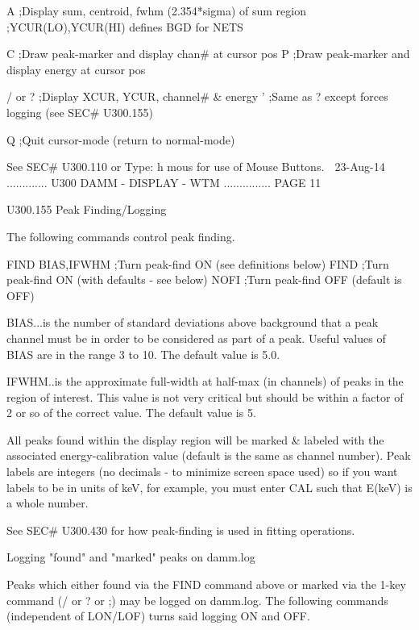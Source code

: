    A              ;Display sum, centroid, fwhm (2.354*sigma) of sum region
                  ;YCUR(LO),YCUR(HI) defines BGD for NETS
 
   C              ;Draw peak-marker and display chan#  at cursor pos
   P              ;Draw peak-marker and display energy at cursor pos
 
   / or ?         ;Display XCUR, YCUR, channel# & energy
   '              ;Same as ? except forces logging (see SEC# U300.155)
 
   Q              ;Quit cursor-mode (return to normal-mode)
 
   See SEC# U300.110 or Type: h mous for use of Mouse Buttons.
    
   23-Aug-14 ............. U300  DAMM - DISPLAY - WTM ............... PAGE  11
 
   U300.155  Peak Finding/Logging
 
   The following commands control peak finding.
 
   FIND BIAS,IFWHM     ;Turn peak-find ON  (see definitions below)
   FIND                ;Turn peak-find ON  (with defaults - see below)
   NOFI                ;Turn peak-find OFF (default is OFF)
 
   BIAS...is the number of standard deviations above background  that  a  peak
          channel  must be in order to be considered as part of a peak. Useful
          values of BIAS are in the range 3 to 10. The default value is 5.0.
 
   IFWHM..is the approximate full-width at half-max (in channels) of peaks  in
          the  region  of interest. This value is not very critical but should
          be within a factor of 2 or so of  the  correct  value.  The  default
          value is 5.
 
   All  peaks  found  within  the display region will be marked & labeled with
   the associated energy-calibration value (default is  the  same  as  channel
   number).  Peak  labels are integers (no decimals - to minimize screen space
   used) so if you want labels to be in units of keV, for  example,  you  must
   enter CAL such that E(keV) is a whole number.
 
   See SEC# U300.430 for how peak-finding is used in fitting operations.
 
   Logging "found" and "marked" peaks on damm.log
 
   Peaks  which  either  found  via  the  FIND command above or marked via the
   1-key command (/ or ? or ;)  may  be  logged  on  damm.log.  The  following
   commands (independent of LON/LOF) turns said logging ON and OFF.
 
